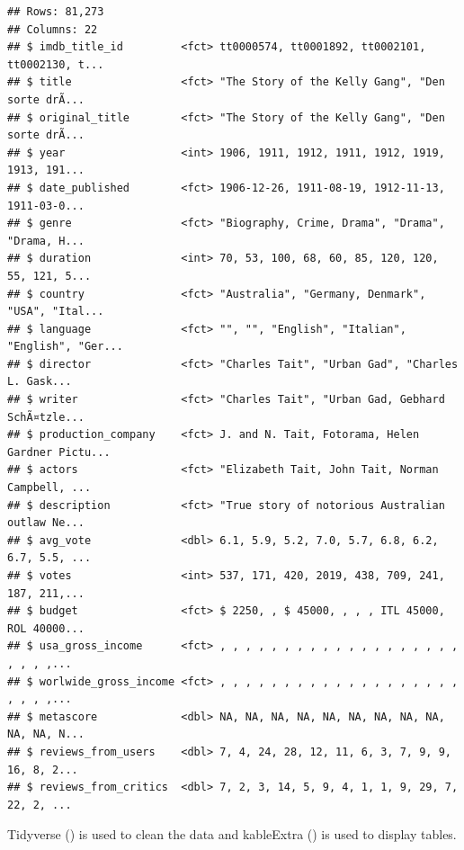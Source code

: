 \documentclass[11pt,a4paper,]{article}
\begin{document}
\begin{verbatim}
## Rows: 81,273
## Columns: 22
## $ imdb_title_id         <fct> tt0000574, tt0001892, tt0002101, tt0002130, t...
## $ title                 <fct> "The Story of the Kelly Gang", "Den sorte drÃ...
## $ original_title        <fct> "The Story of the Kelly Gang", "Den sorte drÃ...
## $ year                  <int> 1906, 1911, 1912, 1911, 1912, 1919, 1913, 191...
## $ date_published        <fct> 1906-12-26, 1911-08-19, 1912-11-13, 1911-03-0...
## $ genre                 <fct> "Biography, Crime, Drama", "Drama", "Drama, H...
## $ duration              <int> 70, 53, 100, 68, 60, 85, 120, 120, 55, 121, 5...
## $ country               <fct> "Australia", "Germany, Denmark", "USA", "Ital...
## $ language              <fct> "", "", "English", "Italian", "English", "Ger...
## $ director              <fct> "Charles Tait", "Urban Gad", "Charles L. Gask...
## $ writer                <fct> "Charles Tait", "Urban Gad, Gebhard SchÃ¤tzle...
## $ production_company    <fct> J. and N. Tait, Fotorama, Helen Gardner Pictu...
## $ actors                <fct> "Elizabeth Tait, John Tait, Norman Campbell, ...
## $ description           <fct> "True story of notorious Australian outlaw Ne...
## $ avg_vote              <dbl> 6.1, 5.9, 5.2, 7.0, 5.7, 6.8, 6.2, 6.7, 5.5, ...
## $ votes                 <int> 537, 171, 420, 2019, 438, 709, 241, 187, 211,...
## $ budget                <fct> $ 2250, , $ 45000, , , , ITL 45000, ROL 40000...
## $ usa_gross_income      <fct> , , , , , , , , , , , , , , , , , , , , , , ,...
## $ worlwide_gross_income <fct> , , , , , , , , , , , , , , , , , , , , , , ,...
## $ metascore             <dbl> NA, NA, NA, NA, NA, NA, NA, NA, NA, NA, NA, N...
## $ reviews_from_users    <dbl> 7, 4, 24, 28, 12, 11, 6, 3, 7, 9, 9, 16, 8, 2...
## $ reviews_from_critics  <dbl> 7, 2, 3, 14, 5, 9, 4, 1, 1, 9, 29, 7, 22, 2, ...
\end{verbatim}

Tidyverse (\textcite{tidyverse}) is used to clean the data and kableExtra (\textcite{kableExtra}) is used to display tables.
\end{document}
